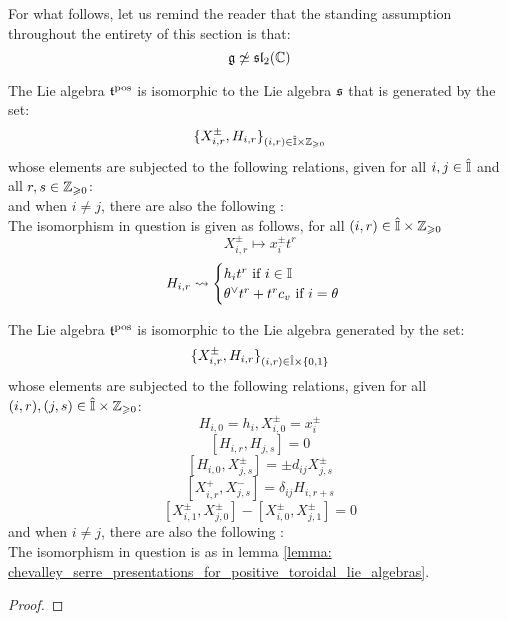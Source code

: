         For what follows, let us remind the reader that the standing assumption throughout the entirety of this section is that:
            $$\mathfrak{g} \not \simeq \mathfrak{sl}_2(\mathbb{C})$$
        \begin{lemma} \label{lemma: chevalley_serre_presentations_for_positive_toroidal_lie_algebras}
            The Lie algebra $\mathfrak{t}^{\mathrm{pos}}$ is isomorphic to the Lie algebra $\mathfrak{s}$ that is generated by the set:
                $$\{X_{i, r}^{\pm}, H_{i, r}\}_{(i, r) \in \hat{\simpleroots} \x \Z_{\geq 0}}$$
            whose elements are subjected to the following relations, given for all $i, j \in \hat{\mathbb{I}}$ and all $r, s \in \mathbb{Z}_{\geqslant 0}$:
                $$$$
            and when $i \not = j$, there are also the following :
                $$$$
            The isomorphism in question is given as follows, for all $(i, r) \in \hat{\simpleroots} \x \Z_{\geq 0}$
                $$X_{i, r}^{\pm} \mapsto x_i^{\pm} t^r$$
                $$
                    H_{i, r} \leadsto
                    \begin{cases}
                        \text{$h_i t^r$ if $i \in \mathbb{I}$}
                        \\
                        \text{$\theta^{\vee} t^r + t^r c_v$ if $i = \theta$}
                    \end{cases}
                $$
        \end{lemma}
        \begin{proposition} \label{prop: levendorskii_presentation_for_positive_toroidal_lie_algebras}
            The Lie algebra $\mathfrak{t}^{\mathrm{pos}}$ is isomorphic to the Lie algebra generated by the set:
                $$\{ X_{i, r}^{\pm}, H_{i, r} \}_{(i, r) \in \hat{\simpleroots} \x \{0, 1\}}$$
            whose elements are subjected to the following relations, given for all $(i, r), (j, s) \in \hat{\simpleroots} \x \Z_{\geq 0}$:
                $$H_{i, 0} = h_i, X_{i, 0}^{\pm} = x_i^{\pm}$$
                $$[ H_{i, r}, H_{j, s} ] = 0$$
                $$[ H_{i, 0}, X_{j, s}^{\pm} ] = \pm d_{ij} X_{j, s}^{\pm}$$
                $$[ X_{i, r}^+, X_{j, s}^- ] = \delta_{ij} H_{i, r + s}$$
                $$[ X_{i, 1}^{\pm}, X_{j, 0}^{\pm} ] - [ X_{i, 0}^{\pm}, X_{j, 1}^{\pm} ] = 0$$
            and when $i \not = j$, there are also the following :
                $$$$
            The isomorphism in question is as in lemma \ref{lemma: chevalley_serre_presentations_for_positive_toroidal_lie_algebras}.
        \end{proposition}
            \begin{proof}
                
            \end{proof}
    
